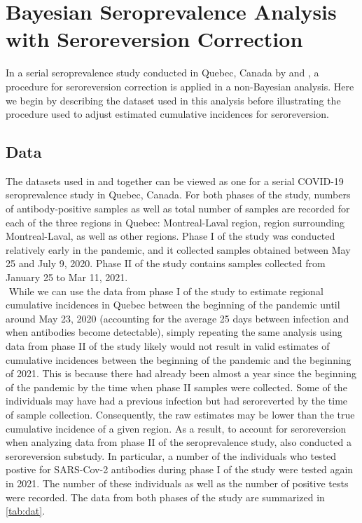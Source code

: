 \section{Bayesian Seroprevalence Analysis with Seroreversion Correction}
In a serial seroprevalence study conducted in Quebec, Canada by \cite{lewin2021sars} and \cite{lewin2022seroprevalence}, a procedure for seroreversion correction is applied in a non-Bayesian analysis. Here we begin by describing the dataset used in this analysis before illustrating the procedure used to adjust estimated cumulative incidences for seroreversion.
\subsection{Data}
The datasets used in \cite{lewin2021sars} and \cite{lewin2022seroprevalence} together can be viewed as one for a serial COVID-19 seroprevalence study in Quebec, Canada. For both phases of the study, numbers of antibody-positive samples as well as total number of samples are recorded for each of the three regions in Quebec: Montreal-Laval region, region surrounding Montreal-Laval, as well as other regions. Phase I of the study was conducted relatively early in the pandemic, and it collected samples obtained between May 25 and July 9, 2020. Phase II of the study contains samples collected from  January 25 to Mar 11, 2021.\\
\newline $ $
While we can use the data from phase I of the study to estimate regional cumulative incidences in Quebec between the beginning of the pandemic until around May 23, 2020 (accounting for the average 25 days between infection and when antibodies become detectable), simply repeating the same analysis using data from phase II of the study likely would not result in valid estimates of cumulative incidences between the beginning of the pandemic and the beginning of 2021. This is because there had already been almost a year since the beginning of the pandemic by the time when phase II samples were collected. Some of the individuals may have had a previous infection but had seroreverted by the time of sample collection. Consequently, the raw estimates may be lower than the true cumulative incidence of a given region. As a result, to account for seroreversion when analyzing data from phase II of the seroprevalence study, \cite{lewin2022seroprevalence} also conducted a seroreversion substudy. In particular, a number of the individuals who tested postive for SARS-Cov-2 antibodies during phase I of the study were tested again in 2021. The number of these individuals as well as the number of positive tests were recorded. The data from both phases of the study are summarized in \cref{tab:dat}.\\
